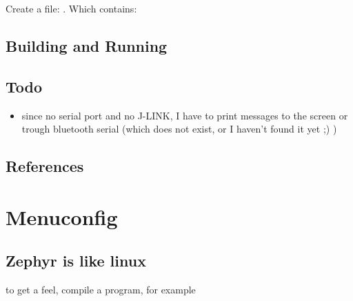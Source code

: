 \documentclass[letterpaper,10pt,english]{sphinxmanual}
\begin{document}
Create a file: .
Which contains:

\begin{sphinxVerbatim}[commandchars=\\\{\}]
 
 
        
        
\end{sphinxVerbatim}


\section{Building and Running}
\label{\detokenize{bma280:building-and-running}}

\section{Todo}
\label{\detokenize{bma280:todo}}\begin{itemize}
\item {} 
since no serial port and no J-LINK, I have to print messages to the screen or trough bluetooth serial (which does not exist, or I haven’t found it yet ;) )

\end{itemize}


\section{References}
\label{\detokenize{bma280:references}}

\chapter{Menuconfig}
\label{\detokenize{menuconfig:menuconfig}}\label{\detokenize{menuconfig::doc}}

\section{Zephyr is like linux}
\label{\detokenize{menuconfig:zephyr-is-like-linux}}
  to get a feel, compile a program, for example

\begin{sphinxVerbatim}[commandchars=\\\{\}]
\end{sphinxVerbatim}
\end{document}

